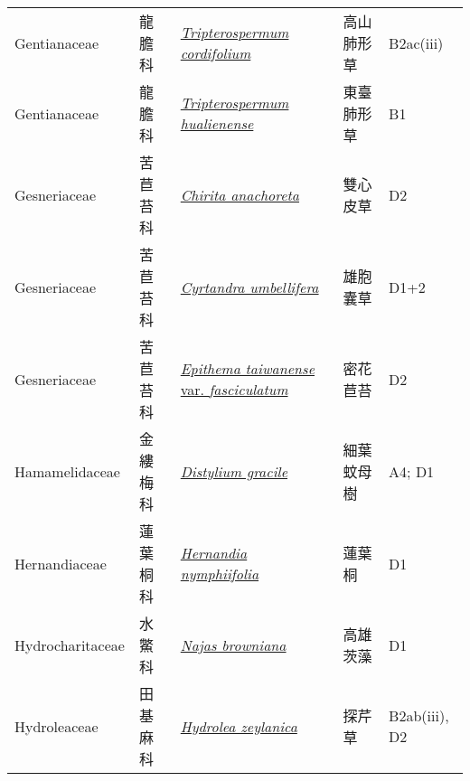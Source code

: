{\begin{longtable}{p{2.5cm}p{2.5cm}p{4.5cm}p{2.5cm}p{3cm}}
    Gentianaceae & 龍膽科 & \href{http://www.theplantlist.org/tpl1.1/search?q=Tripterospermum+cordifolium}{\textit{Tripterospermum cordifolium} } & 高山肺形草 & B2ac(iii) \index{Tripterospermum@\textit{Tripterospermum}!cordifolium@\textit{cordifolium}}  \index{高山肺形草} \\
    Gentianaceae & 龍膽科 & \href{http://www.theplantlist.org/tpl1.1/search?q=Tripterospermum+hualienense}{\textit{Tripterospermum hualienense} } & 東臺肺形草 & B1 \index{Tripterospermum@\textit{Tripterospermum}!hualienense@\textit{hualienense}}  \index{東臺肺形草} \\
    Gesneriaceae & 苦苣苔科 & \href{http://www.theplantlist.org/tpl1.1/search?q=Chirita+anachoreta}{\textit{Chirita anachoreta} } & 雙心皮草 & D2 \index{Chirita@\textit{Chirita}!anachoreta@\textit{anachoreta}}  \index{雙心皮草} \\
    Gesneriaceae & 苦苣苔科 & \href{http://www.theplantlist.org/tpl1.1/search?q=Cyrtandra+umbellifera}{\textit{Cyrtandra umbellifera} } & 雄胞囊草 & D1+2 \index{Cyrtandra@\textit{Cyrtandra}!umbellifera@\textit{umbellifera}}  \index{雄胞囊草} \\
    Gesneriaceae & 苦苣苔科 & \href{http://www.theplantlist.org/tpl1.1/search?q=Epithema+taiwanense+var.+fasciculatum}{\textit{Epithema taiwanense} var. \textit{fasciculatum} } & 密花苣苔 & D2 \index{Epithema@\textit{Epithema}!taiwanense@\textit{taiwanense}!var. fasciculatum@var. \textit{fasciculatum}}  \index{密花苣苔} \\
    Hamamelidaceae & 金縷梅科 & \href{http://www.theplantlist.org/tpl1.1/search?q=Distylium+gracile}{\textit{Distylium gracile} } & 細葉蚊母樹 & A4; D1 \index{Distylium@\textit{Distylium}!gracile@\textit{gracile}}  \index{細葉蚊母樹} \\
    Hernandiaceae & 蓮葉桐科 & \href{http://www.theplantlist.org/tpl1.1/search?q=Hernandia+nymphiifolia}{\textit{Hernandia nymphiifolia} } & 蓮葉桐 & D1 \index{Hernandia@\textit{Hernandia}!nymphiifolia@\textit{nymphiifolia}}  \index{蓮葉桐} \\
    Hydrocharitaceae & 水鱉科 & \href{http://www.theplantlist.org/tpl1.1/search?q=Najas+browniana}{\textit{Najas browniana} } & 高雄茨藻 & D1 \index{Najas@\textit{Najas}!browniana@\textit{browniana}}  \index{高雄茨藻} \\
    Hydroleaceae & 田基麻科 & \href{http://www.theplantlist.org/tpl1.1/search?q=Hydrolea+zeylanica}{\textit{Hydrolea zeylanica} } & 探芹草 & B2ab(iii), D2 \index{Hydrolea@\textit{Hydrolea}!zeylanica@\textit{zeylanica}}  \index{探芹草} \\

\end{longtable}}
